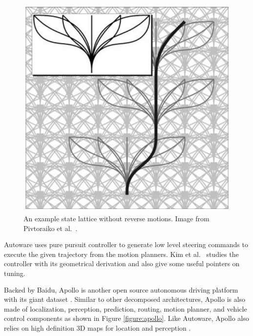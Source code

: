 \begin{figure}[h]
  \centering
  \includegraphics[width=.8\textwidth]{figures/state-lattice.png}
  \caption[An example state lattice]{An example state lattice without reverse
    motions. Image from Pivtoraiko et al.\
    \cite{Pivtoraiko2009DifferentiallyCM}.}
  \label{figure:state-lattice}
\end{figure}

Autoware uses pure pursuit controller to generate low level steering commands
to execute the given trajectory from the motion planners. Kim et al.\
\cite{Kim2013SensorbasedMP} studies the controller with its geometrical
derivation and also give some useful pointers on tuning.

Backed by Baidu, Apollo is another open source autonomous driving platform with
its giant dataset \cite{Huang2018TheAD}. Similar to other decomposed
architectures, Apollo is also made of localization, perception, prediction,
routing, motion planner, and vehicle control components as shown in Figure
\ref{figure:apollo}. Like Autoware, Apollo also relies on high definition 3D
maps for location and perception \cite{Fan2018BaiduAE}.

